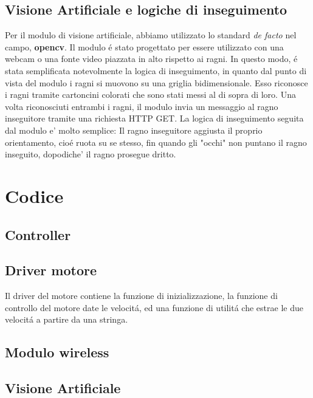 \documentclass [11pt ,a4paper ,twoside ]{article}
\begin{document}
\subsection{Visione Artificiale e logiche di inseguimento}
Per il modulo di visione artificiale, abbiamo utilizzato lo standard \textit{de facto} nel campo, \textbf{opencv}. Il modulo \'e stato progettato per essere utilizzato con una webcam o una fonte video piazzata in alto rispetto ai ragni. In questo modo, \'e stata semplificata notevolmente la logica di inseguimento, in quanto dal punto di vista del modulo i ragni si muovono su una griglia bidimensionale. Esso riconosce i ragni tramite cartoncini colorati che sono stati messi al di sopra di loro. Una volta riconosciuti entrambi i ragni, il modulo invia un messaggio al ragno inseguitore tramite una richiesta HTTP GET. La logica di inseguimento seguita dal modulo e' molto semplice: Il ragno inseguitore aggiusta il proprio orientamento, cio\'e ruota su se stesso, fin quando gli "occhi" non puntano il ragno inseguito, dopodiche' il ragno prosegue dritto.

\section{Codice}

\subsection{Controller}

\subsection{Driver motore}

Il driver del motore contiene la funzione di inizializzazione, la funzione di controllo del motore date le velocit\'a, ed una funzione di utilit\'a che estrae le due velocit\'a a partire da una stringa.



\subsection{Modulo wireless}



\subsection{Visione Artificiale}
\end{document}
